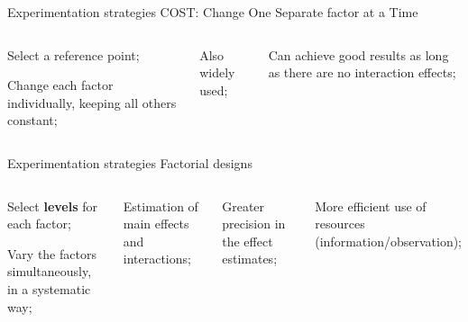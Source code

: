 \documentclass[t]{beamer}
\begin{document}

\begin{ftst}
{Experimentation strategies}
{COST: Change One Separate factor at a Time}
\begin{columns}[T]
	\begin{block}{}
		\bitems Select a reference point;
			\item Change each factor individually, keeping all others constant;
		\eitem
	\end{block}
	\vone
	\bitems Also widely used;
		\item Can achieve good results as long as there are no interaction effects;
	\eitem
\end{columns}
\end{ftst}


\begin{ftst}
{Experimentation strategies}
{Factorial designs}
\begin{columns}[T]
	\begin{block}{}
		\bitems Select \textbf{levels} for each factor;
			\item Vary the factors simultaneously, in a systematic way;
		\eitem
	\end{block}
	\bitems Estimation of main effects and interactions;
		\item Greater precision in the effect estimates;
		\item More efficient use of resources (information/observation);
	\eitem
\end{columns}
\end{ftst}
\end{document}

